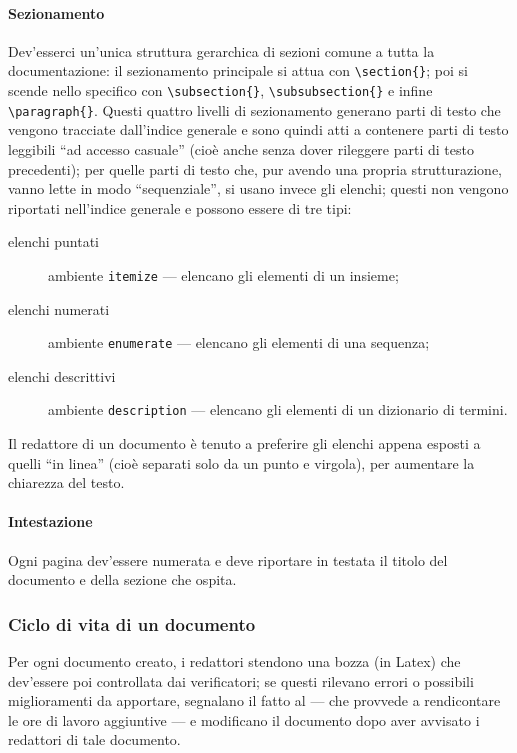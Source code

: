 \paragraph{Sezionamento} Dev'esserci un'unica struttura gerarchica di sezioni comune a tutta la documentazione: il sezionamento principale si attua con \texttt{\textbackslash section\{\}}; poi si scende nello specifico con \texttt{\textbackslash subsection\{\}}, \texttt{\textbackslash subsubsection\{\}} e infine \texttt{\textbackslash paragraph\{\}}. Questi quattro livelli di sezionamento generano parti di testo che vengono tracciate dall'indice generale e sono quindi atti a contenere parti di testo leggibili “ad accesso casuale” (cioè anche senza dover rileggere parti di testo precedenti); per quelle parti di testo che, pur avendo una propria strutturazione, vanno lette in modo “sequenziale”, si usano invece gli elenchi; questi non vengono riportati nell'indice generale e possono essere di tre tipi:
\begin{description}
	\item[elenchi puntati] ambiente \texttt{itemize} --- elencano gli elementi di un insieme;
	\item[elenchi numerati] ambiente \texttt{enumerate} --- elencano gli elementi di una sequenza;
	\item[elenchi descrittivi] ambiente \texttt{description} --- elencano gli elementi di un dizionario di termini.
\end{description}
Il redattore di un documento è tenuto a preferire gli elenchi appena esposti a quelli “in linea” (cioè separati solo da un punto e virgola), per aumentare la chiarezza del testo.
\paragraph{Intestazione} Ogni pagina dev'essere numerata e deve riportare in testata il titolo del documento e della sezione che ospita. %

\subsubsection{Ciclo di vita di un documento} Per ogni documento creato, i redattori stendono una bozza (in Latex) che dev'essere poi controllata dai verificatori; se questi rilevano errori o possibili miglioramenti da apportare, segnalano il fatto al  --- che provvede a rendicontare le ore di lavoro aggiuntive --- e modificano il documento dopo aver avvisato i redattori di tale documento.


